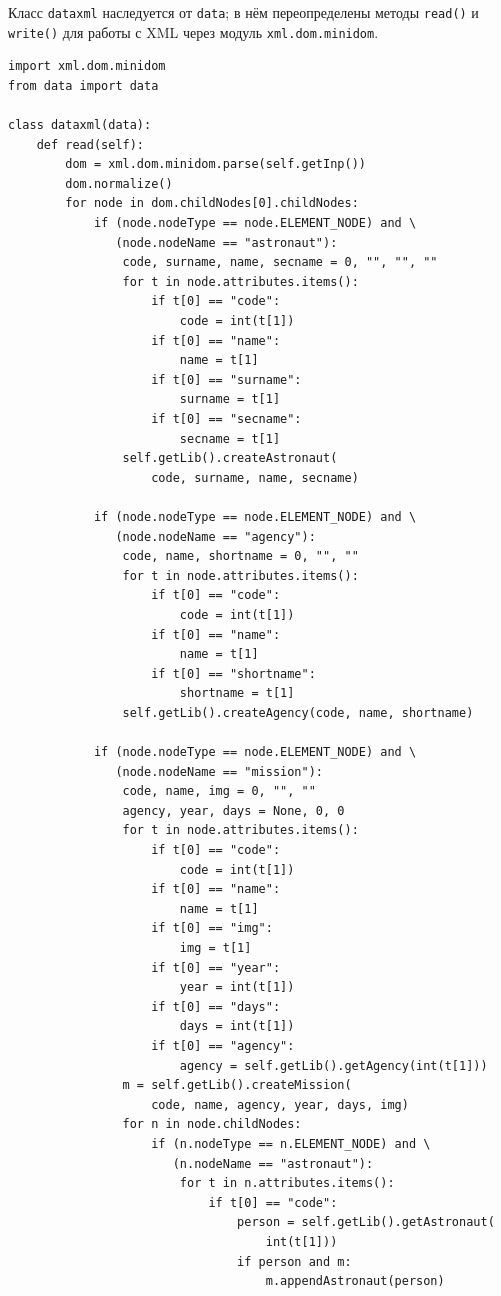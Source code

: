 \documentclass[a4paper,14pt]{extarticle}
\begin{document}
Класс \texttt{dataxml} наследуется от \texttt{data}; в нём переопределены методы \texttt{read()} и \texttt{write()} для работы с XML через модуль \texttt{xml.dom.minidom}.

\begin{lstlisting}[caption={Модуль \texttt{dataxml.py}: метод \texttt{read()}}]
import xml.dom.minidom
from data import data

class dataxml(data):
    def read(self):
        dom = xml.dom.minidom.parse(self.getInp())
        dom.normalize()
        for node in dom.childNodes[0].childNodes:
            if (node.nodeType == node.ELEMENT_NODE) and \
               (node.nodeName == "astronaut"):
                code, surname, name, secname = 0, "", "", ""
                for t in node.attributes.items():
                    if t[0] == "code":
                        code = int(t[1])
                    if t[0] == "name":
                        name = t[1]
                    if t[0] == "surname":
                        surname = t[1]
                    if t[0] == "secname":
                        secname = t[1]
                self.getLib().createAstronaut(
                    code, surname, name, secname)

            if (node.nodeType == node.ELEMENT_NODE) and \
               (node.nodeName == "agency"):
                code, name, shortname = 0, "", ""
                for t in node.attributes.items():
                    if t[0] == "code":
                        code = int(t[1])
                    if t[0] == "name":
                        name = t[1]
                    if t[0] == "shortname":
                        shortname = t[1]
                self.getLib().createAgency(code, name, shortname)

            if (node.nodeType == node.ELEMENT_NODE) and \
               (node.nodeName == "mission"):
                code, name, img = 0, "", ""
                agency, year, days = None, 0, 0
                for t in node.attributes.items():
                    if t[0] == "code":
                        code = int(t[1])
                    if t[0] == "name":
                        name = t[1]
                    if t[0] == "img":
                        img = t[1]
                    if t[0] == "year":
                        year = int(t[1])
                    if t[0] == "days":
                        days = int(t[1])
                    if t[0] == "agency":
                        agency = self.getLib().getAgency(int(t[1]))
                m = self.getLib().createMission(
                    code, name, agency, year, days, img)
                for n in node.childNodes:
                    if (n.nodeType == n.ELEMENT_NODE) and \
                       (n.nodeName == "astronaut"):
                        for t in n.attributes.items():
                            if t[0] == "code":
                                person = self.getLib().getAstronaut(
                                    int(t[1]))
                                if person and m:
                                    m.appendAstronaut(person)
\end{lstlisting}
\end{document}
